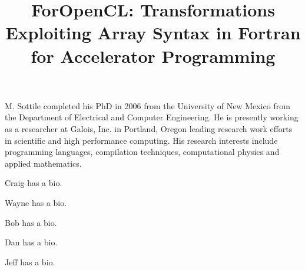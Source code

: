 \documentclass{doublecol-new}
\begin{document}
\thispagestyle{plain}



\title{ForOpenCL: Transformations Exploiting Array Syntax in Fortran for Accelerator Programming}







\begin{bio}
M. Sottile completed his PhD in 2006 from the University of New Mexico
from the Department of Electrical and Computer Engineering.  He is
presently working as a researcher at Galois, Inc. in Portland, Oregon
leading research work efforts in scientific and high performance computing.
His research interests include programming languages, compilation techniques,
computational physics and applied mathematics.

\noindent Craig has a bio.

\noindent Wayne has a bio.

\noindent Bob has a bio.

\noindent Dan has a bio.

\noindent Jeff has a bio.
\end{bio}
\end{document}
